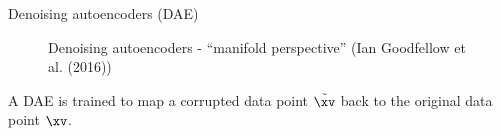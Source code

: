 \begin{vbframe}{Denoising autoencoders (DAE)}
\framebreak
  \begin{figure}
    \centering
    \caption{Denoising autoencoders - \enquote{manifold perspective} (Ian Goodfellow et al. (2016))}
  \end{figure}
    A DAE is trained to map a corrupted data point $\tilde{\xv}$ back to
the original data point $\xv$.
  \framebreak
\begin{figure}

\end{figure}
\end{vbframe}
